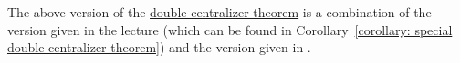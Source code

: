 \begin{remark}
  The above version of the \hyperref[theorem: general double centralizer theorem]{double centralizer theorem} is a combination of the version given in the lecture (which can be found in Corollary~\ref{corollary: special double centralizer theorem}) and the version given in \cite{AP2012DoubleCommutant}.
\end{remark}





